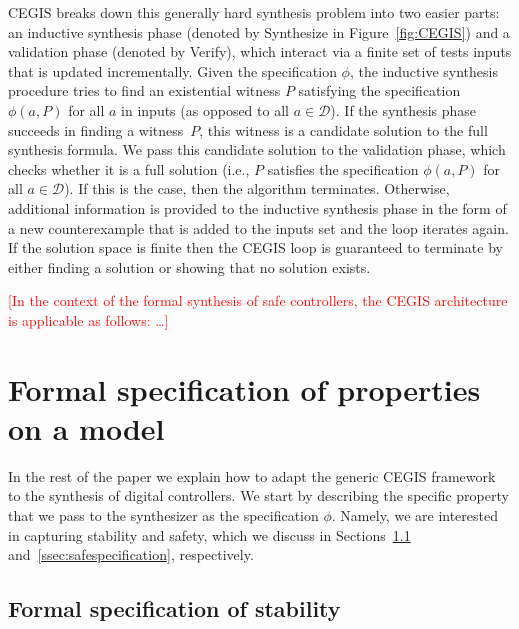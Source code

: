 \documentclass[twocolumn]{autart}    %
\renewcommand{\note}[1]{\textcolor{red}{[#1]}}
\begin{document}
CEGIS breaks down this generally hard synthesis problem into two easier parts:
an inductive synthesis phase (denoted by {\sc Synthesize} in
Figure~\ref{fig:CEGIS}) and a validation phase (denoted by {\sc
  Verify}), which interact via a finite set of tests {\sc
  inputs} that is updated incrementally.
Given the specification $\phi$, the inductive synthesis procedure tries to
find an existential witness $P$ satisfying the specification
$\phi(a, P)$ for all $a$ in {\sc inputs} (as opposed to all $a \in
\mathcal{D}$).
%
If the synthesis phase succeeds in finding a witness~$P$, this witness is a
candidate solution to the full synthesis formula.  We pass this candidate
solution to the validation phase, which checks whether it is a full solution
(i.e., $P$ satisfies the specification $\phi(a, P)$ for all
$a\in\mathcal{D}$).  If this is the case, then the algorithm terminates. 
Otherwise, additional information is provided to the inductive synthesis
phase in the form of a new counterexample that is added to the {\sc inputs}
set and the loop iterates again.  %
If the solution space is finite then the CEGIS loop is guaranteed to
terminate by either finding a solution or showing that no solution
exists.

\note{In the context of the formal synthesis of safe controllers, 
the CEGIS architecture is applicable as follows: \ldots }

\section{Formal specification of properties on a model} 
\label{sec:specification}

In the rest of the paper we explain how to adapt the generic CEGIS framework to the synthesis of digital controllers. 
We start by describing the specific property that we pass to the synthesizer as the specification $\phi$. 
Namely, we are interested in capturing stability and safety, 
which we discuss in Sections~\ref{ssec:stabspecification} and~\ref{ssec:safespecification}, respectively.

\subsection{Formal specification of stability} 
\label{ssec:stabspecification}
\end{document}
